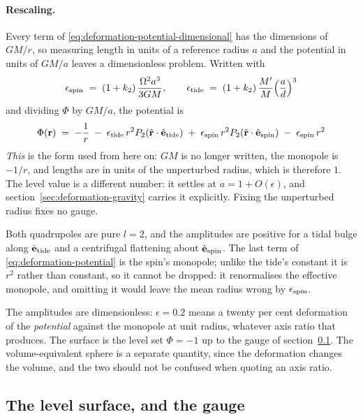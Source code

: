 \paragraph{Rescaling.}  Every term of \eqref{eq:deformation-potential-dimensional} has the
dimensions of $GM/r$, so measuring length in units of a reference radius $a$ and the potential in
units of $GM/a$ leaves a dimensionless problem.  Written with
\begin{equation}
  \epsilon_\text{spin} \;=\; (1 + k_2)\,\frac{\Omega^{2}a^{3}}{3GM} , \qquad
  \epsilon_\text{tide} \;=\; (1 + k_2)\,\frac{M'}{M}\Bigl(\frac{a}{d}\Bigr)^{3}
  \label{eq:deformation-amplitudes}
\end{equation}
and dividing $\Phi$ by $GM/a$, the potential is
\begin{equation}
  \Phi({\mathbf r}) \;=\; -\frac{1}{r}
    \;-\; \epsilon_\text{tide}\, r^2 P_2(\hat{\mathbf r}\cdot \hat{\mathbf e}_\text{tide})
    \;+\; \epsilon_\text{spin}\, r^2 P_2(\hat{\mathbf r}\cdot \hat{\mathbf e}_\text{spin})
    \;-\; \epsilon_\text{spin}\, r^2
  \label{eq:deformation-potential}
\end{equation}
\emph{This} is the form used from here on: $GM$ is no longer written, the monopole is $-1/r$, and
lengths are in units of the unperturbed radius, which is therefore $1$.  The level value is a
different number: it settles at $a = 1 + O(\epsilon)$, and
section~\ref{sec:deformation-gravity} carries it explicitly.  Fixing the unperturbed radius fixes
no gauge.

Both quadrupoles are pure $l = 2$, and the amplitudes are positive for a tidal bulge along
$\hat{\mathbf e}_\text{tide}$ and a centrifugal flattening about $\hat{\mathbf e}_\text{spin}$.
The last term of \eqref{eq:deformation-potential} is the spin's monopole; unlike the tide's
constant it is $r^2$ rather than constant, so it cannot be dropped: it renormalises the
effective monopole, and omitting it would leave the mean radius wrong by $\epsilon_\text{spin}$.

The amplitudes are dimensionless: $\epsilon = 0.2$ means a twenty per cent deformation of the
\emph{potential} against the monopole at unit radius, whatever axis ratio that produces.  The
surface is the level set $\Phi = -1$ up to the gauge of section~\ref{sec:deformation-closure}.
The volume-equivalent sphere is a separate quantity, since the deformation changes the volume,
and the two should not be confused when quoting an axis ratio.

\subsection{The level surface, and the gauge}
\label{sec:deformation-closure}

